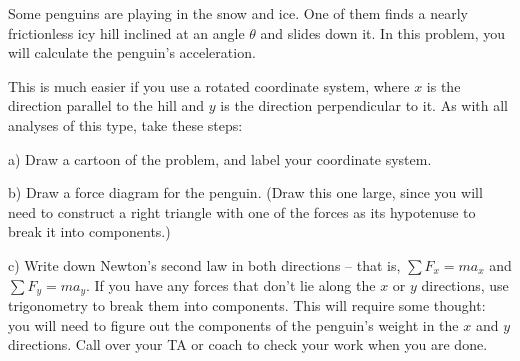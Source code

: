 \documentclass[12pt]{article}
\begin{document}
		\Large
		\centerline{}
		\normalsize
		\centerline{}
		
		Some penguins are playing in the snow and ice. One of them finds a nearly frictionless icy hill inclined at an angle $\theta$ and slides down it. In this problem, you will
		calculate the penguin's acceleration.
		
%		
%		
%		
%		
%		
%		
%		
%		
%		
%		
%		
		This is much easier if you use a rotated coordinate system, where $x$ is the direction parallel to the hill and $y$ is the direction perpendicular to it. As with all analyses of this type, take these steps:
		
		a) Draw a cartoon of the problem, and label your coordinate system.
		
		\vspace{2in}
		
		b) Draw a force diagram for the penguin. (Draw this one large, since you will need to construct a right triangle
		with one of the forces as its hypotenuse to break it into components.)
		
		\vspace{3in}\newpage
		
		c) Write down Newton's second law in both directions -- that is, $\sum F_x = ma_x$ and $\sum F_y = ma_y$.
		If you have any forces that don't lie along the $x$ or $y$ directions, use trigonometry to break them into components.
		This will require some thought: you will need to figure out the components of the
		penguin's weight in the $x$ and $y$ directions. Call over your TA or coach to check your work when you are done.
		
\end{document}
